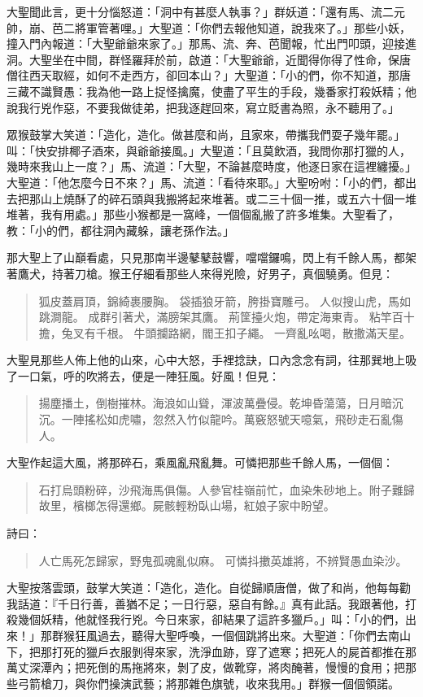 大聖聞此言，更十分惱怒道：「洞中有甚麼人執事？」群妖道：「還有馬、流二元帥，崩、芭二將軍管著哩。」大聖道：「你們去報他知道，說我來了。」那些小妖，撞入門內報道：「大聖爺爺來家了。」那馬、流、奔、芭聞報，忙出門叩頭，迎接進洞。大聖坐在中間，群怪羅拜於前，啟道：「大聖爺爺，近聞得你得了性命，保唐僧往西天取經，如何不走西方，卻回本山？」大聖道：「小的們，你不知道，那唐三藏不識賢愚：我為他一路上捉怪擒魔，使盡了平生的手段，幾番家打殺妖精；他說我行兇作惡，不要我做徒弟，把我逐趕回來，寫立貶書為照，永不聽用了。」

眾猴鼓掌大笑道：「造化，造化。做甚麼和尚，且家來，帶攜我們耍子幾年罷。」叫：「快安排椰子酒來，與爺爺接風。」大聖道：「且莫飲酒，我問你那打獵的人，幾時來我山上一度？」馬、流道：「大聖，不論甚麼時度，他逐日家在這裡纏擾。」大聖道：「他怎麼今日不來？」馬、流道：「看待來耶。」大聖吩咐：「小的們，都出去把那山上燒酥了的碎石頭與我搬將起來堆著。或二三十個一推，或五六十個一堆堆著，我有用處。」那些小猴都是一窩峰，一個個亂搬了許多堆集。大聖看了，教：「小的們，都往洞內藏躲，讓老孫作法。」

那大聖上了山巔看處，只見那南半邊鼕鼕鼓響，噹噹鑼鳴，閃上有千餘人馬，都架著鷹犬，持著刀槍。猴王仔細看那些人來得兇險，好男子，真個驍勇。但見：
\begin{quote}
狐皮蓋肩頂，錦綺裹腰胸。
袋插狼牙箭，胯掛寶雕弓。
人似搜山虎，馬如跳澗龍。
成群引著犬，滿膀架其鷹。
荊筐擡火炮，帶定海東青。
粘竿百十擔，兔叉有千根。
牛頭攔路網，閻王扣子繩。
一齊亂吆喝，散撒滿天星。
\end{quote}

大聖見那些人佈上他的山來，心中大怒，手裡捻訣，口內念念有詞，往那巽地上吸了一口氣，呼的吹將去，便是一陣狂風。好風！但見：
\begin{quote}
揚塵播土，倒樹摧林。海浪如山聳，渾波萬疊侵。乾坤昏蕩蕩，日月暗沉沉。一陣搖松如虎嘯，忽然入竹似龍吟。萬竅怒號天噫氣，飛砂走石亂傷人。
\end{quote}

大聖作起這大風，將那碎石，乘風亂飛亂舞。可憐把那些千餘人馬，一個個：
\begin{quote}
石打烏頭粉碎，沙飛海馬俱傷。人參官桂嶺前忙，血染朱砂地上。附子難歸故里，檳榔怎得還鄉。屍骸輕粉臥山場，紅娘子家中盼望。
\end{quote}

詩曰：
\begin{quote}
人亡馬死怎歸家，野鬼孤魂亂似麻。
可憐抖擻英雄將，不辨賢愚血染沙。
\end{quote}

大聖按落雲頭，鼓掌大笑道：「造化，造化。自從歸順唐僧，做了和尚，他每每勸我話道：『千日行善，善猶不足；一日行惡，惡自有餘。』真有此話。我跟著他，打殺幾個妖精，他就怪我行兇。今日來家，卻結果了這許多獵戶。」叫：「小的們，出來！」那群猴狂風過去，聽得大聖呼喚，一個個跳將出來。大聖道：「你們去南山下，把那打死的獵戶衣服剝得來家，洗淨血跡，穿了遮寒；把死人的屍首都推在那萬丈深潭內；把死倒的馬拖將來，剝了皮，做靴穿，將肉醃著，慢慢的食用；把那些弓箭槍刀，與你們操演武藝；將那雜色旗號，收來我用。」群猴一個個領諾。

